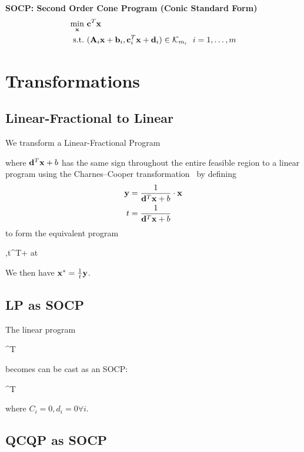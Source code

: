 \textbf{SOCP: Second Order Cone Program (Conic Standard Form)}
\begin{align}
\min_{\mathbf{x}}      ~& \mathbf{c}^T \mathbf{x} \\
\textrm{s.t.}   ~& (\mathbf{A}_i \mathbf{x}+\mathbf{b}_i, \mathbf{c}_i^T \mathbf{x}+\mathbf{d}_i)\in\mathcal{K}_{m_i} ~~i=1,\ldots,m
\end{align}

\section{Transformations}

\subsection{Linear-Fractional to Linear}
We transform a Linear-Fractional Program
\begin{maxi!}{\vx}{}{}{}
\addConstraint{\mA\vx}{\le \vb}
\end{maxi!}
where $\mathbf{d}^T \mathbf{x} + b$ has the same sign throughout the entire feasible region to a linear program using the Charnes--Cooper transformation~\citep{Charnes1962} by defining
\begin{align}
\mathbf{y} &= \frac{1}{\mathbf{d}^T\mathbf{x}+b}\cdot\mathbf{x} \\
t   &= \frac{1}{\mathbf{d}^T\mathbf{x}+b}
\end{align}
to form the equivalent program
\begin{maxi!}{\vy,t}{\vc^T\vy + at}{}{}
\end{maxi!}
We then have $\mathbf{x}^*=\frac{1}{t}\mathbf{y}$.

\subsection{LP as SOCP}

The linear program
\begin{mini!}{\vx}{\vc^T \vx}{}{}
\addConstraint{\mA\vx}{\le \vb}
\end{mini!}
becomes can be cast as an SOCP:
\begin{mini!}{\vx}{\vc^T \vx}{}{}
\end{mini!}
where $C_i=0, d_i=0 \forall i$.

\subsection{QCQP as SOCP}

